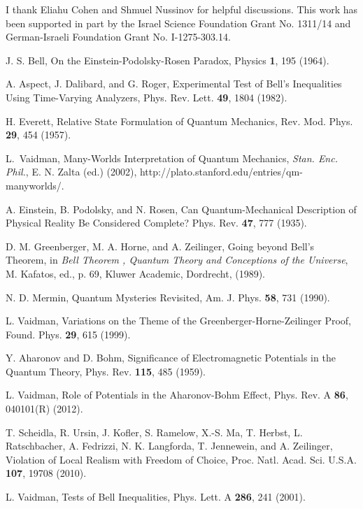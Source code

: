 \documentclass[12pt]{article}
\begin{document}
I thank Eliahu Cohen  and Shmuel Nussinov for helpful discussions. This work has been supported in part by   the Israel Science Foundation  Grant No. 1311/14  and German-Israeli Foundation  Grant No. I-1275-303.14.

\small
\begin{thebibliography}{99}


J. S. Bell,
On the Einstein-Podolsky-Rosen Paradox,
 Physics {\bf 1}, 195 (1964).

A. Aspect, J. Dalibard, and G. Roger,
Experimental Test of Bell's Inequalities Using Time-Varying Analyzers,
Phys. Rev. Lett. {\bf 49}, 1804 (1982).

 H. Everett,
 Relative State Formulation of Quantum Mechanics,
  Rev.  Mod. Phys.  {\bf 29}, 454 (1957).


 L.~Vaidman,
  Many-Worlds Interpretation of Quantum
Mechanics, {\it Stan. Enc. Phil.},  E. N. Zalta (ed.) (2002),
http://plato.stanford.edu/entries/qm-manyworlds/.


A. Einstein, B. Podolsky, and N. Rosen,
Can Quantum-Mechanical Description of Physical Reality Be Considered Complete?
Phys. Rev. {\bf 47}, 777 (1935).


D. M. Greenberger, M. A. Horne, and A. Zeilinger,
Going beyond Bell's Theorem,
 in {\it Bell Theorem , Quantum Theory and Conceptions of the Universe}, M. Kafatos, ed., p. 69, Kluwer Academic, Dordrecht, (1989).

N. D. Mermin,
 Quantum Mysteries Revisited,
 Am. J. Phys. {\bf 58}, 731 (1990).

L. Vaidman,
Variations on the Theme of the Greenberger-Horne-Zeilinger Proof,
Found. Phys. {\bf 29}, 615  (1999).


Y. Aharonov and D. Bohm,
Significance of Electromagnetic Potentials in the Quantum Theory,
Phys. Rev. {\bf 115}, 485 (1959).


L. Vaidman,
Role of Potentials in the Aharonov-Bohm Effect,
Phys. Rev. A {\bf 86}, 040101(R) (2012).


T. Scheidla, R. Ursin, J. Kofler, S. Ramelow, X.-S. Ma, T. Herbst, L. Ratschbacher, A. Fedrizzi, N. K. Langforda, T. Jennewein, and A. Zeilinger,
Violation of Local Realism with Freedom of Choice,
 Proc. Natl. Acad. Sci. U.S.A. {\bf 107}, 19708 (2010).

L. Vaidman,
Tests of Bell Inequalities,
Phys. Lett. A  {\bf 286}, 241 (2001).



\end{thebibliography}
\end{document}
